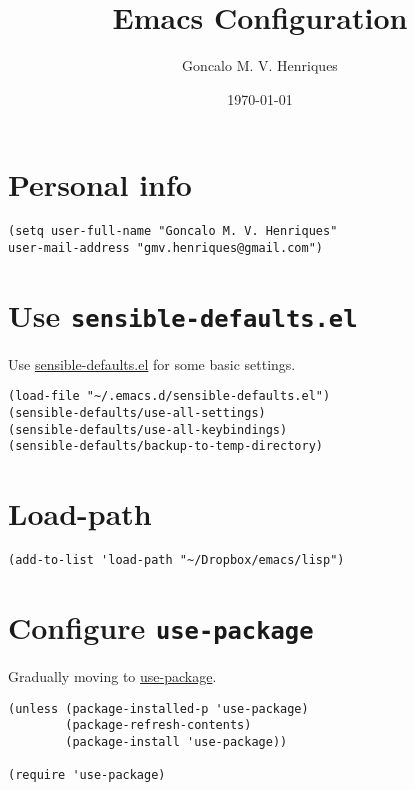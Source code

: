 \documentclass[11pt]{article}
\author{Goncalo M. V. Henriques}
\date{\today}
\title{Emacs Configuration}
\begin{document}
\maketitle
\tableofcontents


\section{Personal info}
\label{sec:orgb134231}

\begin{verbatim}
(setq user-full-name "Goncalo M. V. Henriques"
user-mail-address "gmv.henriques@gmail.com")
\end{verbatim}

\section{Use \texttt{sensible-defaults.el}}
\label{sec:orga49d08b}

Use \href{https://github.com/hrs/sensible-defaults.el}{sensible-defaults.el} for some basic settings.

\begin{verbatim}
(load-file "~/.emacs.d/sensible-defaults.el")
(sensible-defaults/use-all-settings)
(sensible-defaults/use-all-keybindings)
(sensible-defaults/backup-to-temp-directory)
\end{verbatim}

\section{Load-path}
\label{sec:org413b11b}

\begin{verbatim}
(add-to-list 'load-path "~/Dropbox/emacs/lisp")
\end{verbatim}

\section{Configure \texttt{use-package}}
\label{sec:orged5eef5}

Gradually moving to \href{https://github.com/jwiegley/use-package}{use-package}.

\begin{verbatim}
(unless (package-installed-p 'use-package)
        (package-refresh-contents)
        (package-install 'use-package))

(require 'use-package)
\end{verbatim}
\end{document}
